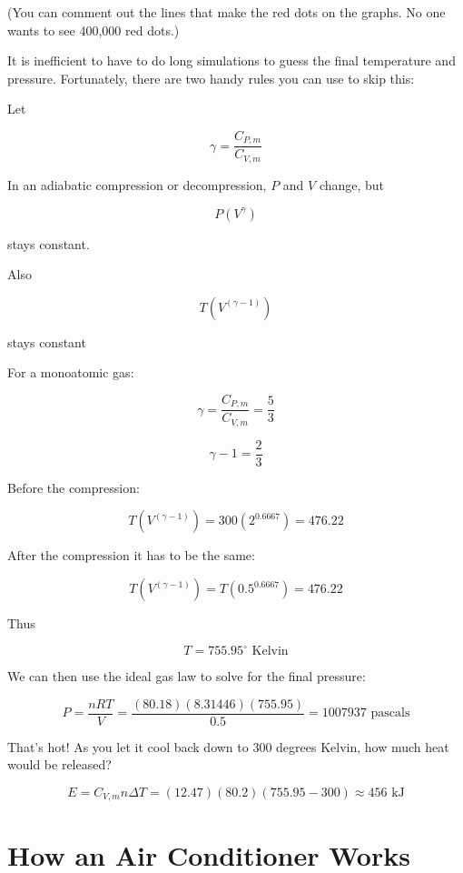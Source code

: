(You can comment out the lines that make the red dots on the graphs.  No
one wants to see 400,000 red dots.)

It is inefficient to have to do long simulations to guess the final temperature and pressure. Fortunately,  there are two handy rules you can use to skip this:

\begin{mdframed}[style=important, frametitle={Adiabatic Compression and Decompression}]

Let 

$$\gamma = \frac{C_{P,m}}{C_{V,m}}$$

In an adiabatic compression or decompression,  $P$ and $V$ change,  but

$$P \left(V^\gamma \right)$$

stays constant.

Also 

$$T \left(V^{\left( \gamma - 1 \right)} \right)$$

stays constant

\end{mdframed}

For a monoatomic gas:

$$\gamma = \frac{C_{P,m}}{C_{V,m}} = \frac{5}{3}$$

$$\gamma - 1 =  \frac{2}{3}$$

Before the compression: 

$$T \left(V^{\left( \gamma - 1 \right)} \right) = 300 \left( 2^{0.6667} \right) = 476.22$$

After the compression it has to be the same:

$$T \left(V^{\left( \gamma - 1 \right)} \right) = T \left( 0.5^{0.6667} \right) = 476.22$$

Thus 

$$T = 755.95^\circ \text{ Kelvin}$$

We can then use the ideal gas law to solve for the final pressure:

$$P = \frac{n R T}{V}  =  \frac{(80.18)(8.31446)(755.95)}{0.5} = 1007937 \text{ pascals}$$

That's hot!  As you let it cool back down to 300 degrees Kelvin,  how much heat would be released?  

$$E = C_{V,m} n \Delta T = (12.47)(80.2)(755.95 - 300) \approx  456 \text{ kJ}$$

\section{How an Air Conditioner Works}

